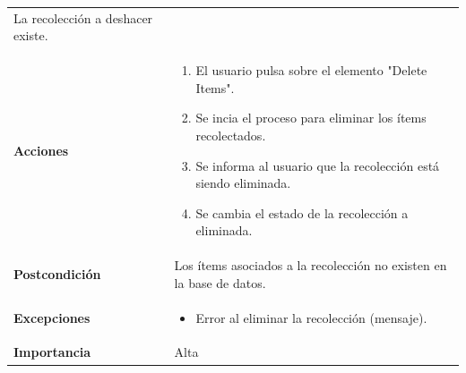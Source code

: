 \documentclass[
]{article}
\providecommand{\tightlist}{%
  \setlength{\itemsep}{0pt}\setlength{\parskip}{0pt}}
\begin{document}
\begin{longtable}[]{@{}ll@{}}
\begin{minipage}[t]{0.69\columnwidth}
La recolección a deshacer existe.\strut
\end{minipage}\tabularnewline
\begin{minipage}[t]{0.25\columnwidth}\raggedright
\textbf{Acciones}\strut
\end{minipage} & \begin{minipage}[t]{0.69\columnwidth}\raggedright
\begin{enumerate}
\def\labelenumi{\arabic{enumi}.}
\tightlist
\item
  El usuario pulsa sobre el elemento "Delete Items".
\item
  Se incia el proceso para eliminar los ítems recolectados.
\item
  Se informa al usuario que la recolección está siendo eliminada.
\item
  Se cambia el estado de la recolección a eliminada.
\end{enumerate}\strut
\end{minipage}\tabularnewline
\begin{minipage}[t]{0.25\columnwidth}\raggedright
\textbf{Postcondición}\strut
\end{minipage} & \begin{minipage}[t]{0.69\columnwidth}\raggedright
Los ítems asociados a la recolección no existen en la base de
datos.\strut
\end{minipage}\tabularnewline
\begin{minipage}[t]{0.25\columnwidth}\raggedright
\textbf{Excepciones}\strut
\end{minipage} & \begin{minipage}[t]{0.69\columnwidth}\raggedright
\begin{itemize}
\tightlist
\item
  Error al eliminar la recolección (mensaje).
\end{itemize}\strut
\end{minipage}\tabularnewline
\begin{minipage}[t]{0.25\columnwidth}\raggedright
\textbf{Importancia}\strut
\end{minipage} & \begin{minipage}[t]{0.69\columnwidth}\raggedright
Alta\strut
\end{minipage}\tabularnewline
\bottomrule
\end{longtable}
\end{document}
